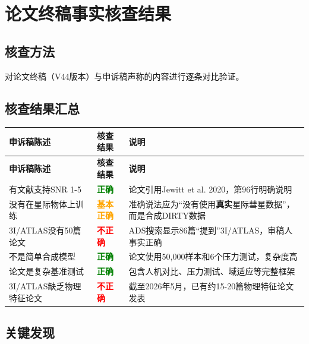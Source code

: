 \documentclass[12pt,a4paper]{article}
\begin{document}
\newpage
\section{论文终稿事实核查结果}

\subsection{核查方法}

对论文终稿（V44版本）与申诉稿声称的内容进行逐条对比验证。

\subsection{核查结果汇总}

\begin{center}
\renewcommand{\arraystretch}{1.4}
\begin{longtable}{|p{4cm}|p{3cm}|p{6cm}|}
\hline
\rowcolor{gray!30}
\textbf{申诉稿陈述} & \textbf{核查结果} & \textbf{说明} \\
\hline
\endfirsthead
\hline
\rowcolor{gray!30}
\textbf{申诉稿陈述} & \textbf{核查结果} & \textbf{说明} \\
\hline
\endhead
有文献支持SNR 1-5 & \textcolor{green}{\textbf{正确}} & 论文引用Jewitt et al. 2020，第96行明确说明 \\
\hline
没有在星际物体上训练 & \textcolor{orange}{\textbf{基本正确}} & 准确说法应为``没有使用\textbf{真实}星际彗星数据''，而是合成DIRTY数据 \\
\hline
3I/ATLAS没有50篇论文 & \textcolor{red}{\textbf{不正确}} & ADS搜索显示86篇``提到''3I/ATLAS，审稿人事实正确 \\
\hline
不是简单合成模型 & \textcolor{green}{\textbf{正确}} & 论文使用50,000样本和6个压力测试，复杂度高 \\
\hline
论文是复杂基准测试 & \textcolor{green}{\textbf{正确}} & 包含人机对比、压力测试、域适应等完整框架 \\
\hline
3I/ATLAS缺乏物理特征论文 & \textcolor{red}{\textbf{不正确}} & 截至2026年5月，已有约15-20篇物理特征论文发表 \\
\hline
\end{longtable}
\end{center}

\subsection{关键发现}
\end{document}
